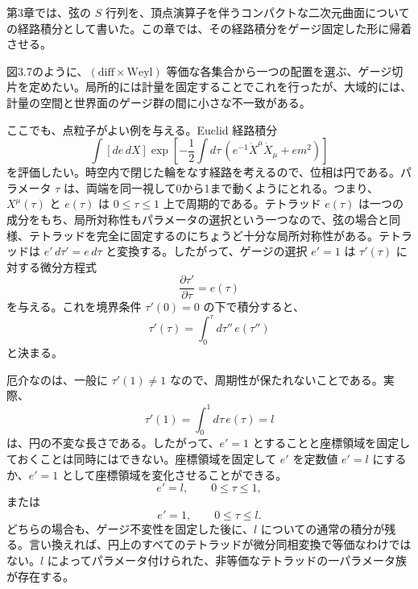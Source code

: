 \label{ch:5}

第3章では、弦の $S$ 行列を、頂点演算子を伴うコンパクトな二次元曲面についての経路積分として書いた。この章では、その経路積分をゲージ固定した形に帰着させる。

\label{sec:5.1}

図3.7のように、$(\mathrm{diff}\times\mathrm{Weyl})$ 等価な各集合から一つの配置を選ぶ、ゲージ切片を定めたい。局所的には計量を固定することでこれを行ったが、大域的には、計量の空間と世界面のゲージ群の間に小さな不一致がある。

ここでも、点粒子がよい例を与える。Euclid 経路積分
\begin{equation}
\int[de\,dX]\exp\left[
-\frac12\int d\tau\,
\left(e^{-1}\dot X^\mu\dot X_\mu+em^2\right)\right]
\tag{5.1.1}\label{eq:5.1.1}
\end{equation}
を評価したい。時空内で閉じた輪をなす経路を考えるので、位相は円である。パラメータ $\tau$ は、両端を同一視して0から1まで動くようにとれる。つまり、$X^\mu(\tau)$ と $e(\tau)$ は $0\leq\tau\leq1$ 上で周期的である。テトラッド $e(\tau)$ は一つの成分をもち、局所対称性もパラメータの選択という一つなので、弦の場合と同様、テトラッドを完全に固定するのにちょうど十分な局所対称性がある。テトラッドは $e'\,d\tau'=e\,d\tau$ と変換する。したがって、ゲージの選択 $e'=1$ は $\tau'(\tau)$ に対する微分方程式
\begin{equation}
\frac{\partial\tau'}{\partial\tau}=e(\tau)
\tag{5.1.2}\label{eq:5.1.2}
\end{equation}
を与える。これを境界条件 $\tau'(0)=0$ の下で積分すると、
\begin{equation}
\tau'(\tau)=\int_0^\tau d\tau''\,e(\tau'')
\tag{5.1.3}\label{eq:5.1.3}
\end{equation}
と決まる。

厄介なのは、一般に $\tau'(1)\ne1$ なので、周期性が保たれないことである。実際、
\begin{equation}
\tau'(1)=\int_0^1d\tau\,e(\tau)=l
\tag{5.1.4}\label{eq:5.1.4}
\end{equation}
は、円の不変な長さである。したがって、$e'=1$ とすることと座標領域を固定しておくことは同時にはできない。座標領域を固定して $e'$ を定数値 $e'=l$ にするか、$e'=1$ として座標領域を変化させることができる。
\begin{equation}
e'=l,\qquad 0\leq\tau\leq1,
\tag{5.1.5a}\label{eq:5.1.5a}
\end{equation}
または
\begin{equation}
e'=1,\qquad 0\leq\tau\leq l.
\tag{5.1.5b}\label{eq:5.1.5b}
\end{equation}
どちらの場合も、ゲージ不変性を固定した後に、$l$ についての通常の積分が残る。言い換えれば、円上のすべてのテトラッドが微分同相変換で等価なわけではない。$l$ によってパラメータ付けられた、非等価なテトラッドの一パラメータ族が存在する。

